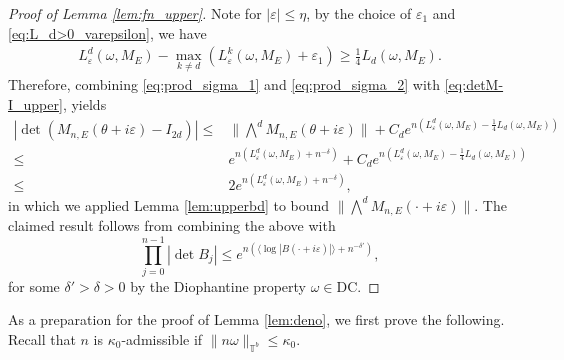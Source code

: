 \documentclass[11pt]{amsart}
\def\tor{\mathbb{T}}
\begin{document}
\begin{proof}[Proof of Lemma \ref{lem:fn_upper}]
Note for $|\varepsilon|\leq \eta$, by the choice of $\varepsilon_1$ and \eqref{eq:L_d>0_varepsilon}, we have
\begin{align}\label{eq:prod_sigma_3}
    L^d_{\varepsilon}(\omega,M_E)-\max_{k\neq d}(L^k_{\varepsilon}(\omega,M_E)+\varepsilon_1)\geq\frac{1}{4}L_d(\omega,M_E).
\end{align}
Therefore, combining \eqref{eq:prod_sigma_1} and \eqref{eq:prod_sigma_2} with \eqref{eq:detM-I_upper}, yields
\begin{align}
    |\det(M_{n,E}(\theta+i\varepsilon)-I_{2d})|
    \leq &\|\textstyle{\bigwedge}^d M_{n,E}(\theta+i\varepsilon)\|+C_d e^{n(L^d_{\varepsilon}(\omega,M_E)-\frac{1}{4}L_d(\omega,M_E))}\\
    \leq &e^{n(L^d_{\varepsilon}(\omega,M_E)+n^{-\delta})}+C_d e^{n(L^d_{\varepsilon}(\omega,M_E)-\frac{1}{4}L_d(\omega,M_E))}\\
    \leq &2e^{n(L^d_{\varepsilon}(\omega,M_E)+n^{-\delta})},
\end{align}
in which we applied Lemma \ref{lem:upperbd} to bound $\|\textstyle{\bigwedge}^d M_{n,E}(\cdot+i\varepsilon)\|$.
The claimed result follows from combining the above with 
\[\prod_{j=0}^{n-1}|\det B_j|\leq e^{n(\langle\log |B(\cdot+i\varepsilon)|\rangle+n^{-\delta'})},\]
for some $\delta'>\delta>0$ by the Diophantine property $\omega\in \mathrm{DC}$.
\end{proof}

As a preparation for the proof of Lemma \ref{lem:deno}, we first prove the following.
Recall that $n$ is $\kappa_0$-admissible if $\|n\omega\|_{\tor^b}\leq \kappa_0$. 
\end{document}
